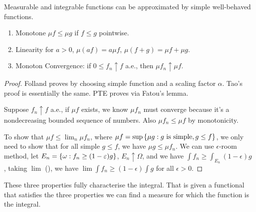 \begin{thm}
    Measurable and integrable functions can be approximated by simple well-behaved functions.   
\end{thm}
\begin{thm}
    
\end{thm}
\begin{thm}
    \begin{enumerate}
        \item Monotone \(\mu f \leq \mu g\) if \(f \leq g\) pointwise.
        \item Linearity for \(a > 0\), \(\mu (af) = a \mu f\), \(\mu(f + g)=  \mu f + \mu g\).
        \item Monoton Convergence: if \(0 \leq f_{n} \uparrow f\) a.e., then \(\mu f_{n} \uparrow \mu f\). 
    \end{enumerate}
\end{thm}
\begin{proof}
    Folland proves by choosing simple function and a scaling factor \(\alpha\). Tao's proof is essentially the same.
    PTE proves via Fatou's lemma. 
    
    Suppose \(f_{n}\uparrow f\) a.e., if \(\mu f\) exists, we know \(\mu f_{n}\) must converge because it's a nondecreasing bounded sequence of numbers. Also \(\mu f_{n} \leq \mu f\) by monotonicity. 

    To show that \(\mu f \leq \lim_{n} \mu f_{n}\), where \(\mu f = \sup \Bqty{\mu g: g \text{ is simple}, g \leq f}\), we only need to show that for all simple \(g \leq f\), we have \(\mu g \leq \mu f_{n}\). We can use \(\epsilon\)-room method, let \(E_{n} = \Bqty{\omega: f_{n} \geq (1 - \epsilon) g}\), \(E_{n} \uparrow \Omega\), and we have \(\int f_{n} \geq \int_{E_{n}} (1 - \epsilon)g\), taking \(\lim\) (), we have \(\lim \int f_{n} \geq (1 - \epsilon) \int g\) for all \(\epsilon> 0\). 
\end{proof}


\begin{remark}
    These three properties fully characterise the integral. That is given a functional that satisfies the three properties we can find a measure for which the function is the integral. 
\end{remark}

